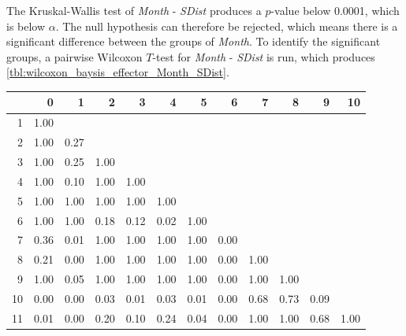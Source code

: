 The Kruskal-Wallis test of \textit{Month} - \textit{SDist} produces a $p$-value below 0.0001, which is below $\alpha$. The null hypothesis can therefore be rejected, which means there is a significant difference between the groups of \textit{Month}. To identify the significant groups, a pairwise Wilcoxon $T$-test for \textit{Month} - \textit{SDist} is run, which produces \cref{tbl:wilcoxon_baysis_effector_Month_SDist}. 
% 
\begin{tabular}{rrrrrrrrrrrr}
  \hline
 & 0 & 1 & 2 & 3 & 4 & 5 & 6 & 7 & 8 & 9 & 10 \\ 
  \hline
1 & 1.00 &  &  &  &  &  &  &  &  &  &  \\ 
  2 & 1.00 & 0.27 &  &  &  &  &  &  &  &  &  \\ 
  3 & 1.00 & 0.25 & 1.00 &  &  &  &  &  &  &  &  \\ 
  4 & 1.00 & 0.10 & 1.00 & 1.00 &  &  &  &  &  &  &  \\ 
  5 & 1.00 & 1.00 & 1.00 & 1.00 & 1.00 &  &  &  &  &  &  \\ 
  6 & 1.00 & 1.00 & 0.18 & 0.12 & 0.02 & 1.00 &  &  &  &  &  \\ 
  7 & 0.36 & 0.01 & 1.00 & 1.00 & 1.00 & 1.00 & 0.00 &  &  &  &  \\ 
  8 & 0.21 & 0.00 & 1.00 & 1.00 & 1.00 & 1.00 & 0.00 & 1.00 &  &  &  \\ 
  9 & 1.00 & 0.05 & 1.00 & 1.00 & 1.00 & 1.00 & 0.00 & 1.00 & 1.00 &  &  \\ 
  10 & 0.00 & 0.00 & 0.03 & 0.01 & 0.03 & 0.01 & 0.00 & 0.68 & 0.73 & 0.09 &  \\ 
  11 & 0.01 & 0.00 & 0.20 & 0.10 & 0.24 & 0.04 & 0.00 & 1.00 & 1.00 & 0.68 & 1.00 \\ 
   \hline
\end{tabular}
% 
